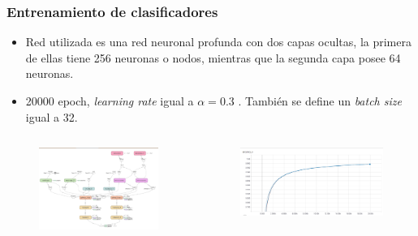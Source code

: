 \documentclass[handout]{beamer}
\begin{document}
\begin{frame}
\frametitle{Entrenamiento de clasificadores}

\begin{itemize}
\item Red utilizada es una red neuronal profunda con dos capas ocultas, la primera de ellas tiene 256 neuronas o nodos, mientras que la segunda capa posee 64 neuronas.

\item 20000 epoch, \textit{learning rate}  igual a $\alpha = 0.3$ . También se define un \textit{batch size} igual a 32.
\end{itemize}
\begin{columns}[t] 

\begin{figure}
\includegraphics[width=\textwidth]{../figures/nn_estructura.png}
\end{figure}



\begin{figure}
\includegraphics[width=\textwidth]{../figures/nn_plot.png}
\end{figure}

\end{columns}


\end{frame}
\end{document}
